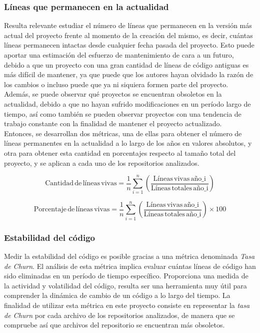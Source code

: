 \documentclass[a4paper, 12pt]{book}
\begin{document}
\subsubsection{Líneas que permanecen en la actualidad}
\label{subsubsec:lineas-vivas}

Resulta relevante estudiar el número de líneas que permanecen en la versión más actual del proyecto frente al momento de la creación del mismo, es decir, cuántas líneas permanecen intactas desde cualquier fecha pasada del proyecto. 
Esto puede aportar una estimación del esfuerzo de mantenimiento de cara a un futuro, debido a que un proyecto con una gran cantidad de líneas de código antiguas es más difícil de mantener, ya que puede que los autores 
hayan olvidado la razón de los cambios o incluso puede que ya ni siquiera formen parte del proyecto. Además, se puede observar qué proyectos se encuentran obsoletos en la actualidad, debido a que no hayan sufrido
modificaciones en un período largo de tiempo, así como también se pueden observar proyectos con una tendencia de trabajo constante con la finalidad de mantener el proyecto actualizado.
\\Entonces, se desarrollan dos métricas, una de ellas para obtener el número de líneas permanentes en la actualidad a lo largo de los años en valores absolutos, y otra para obtener esta cantidad en porcentajes respecto al tamaño total
del proyecto, y se aplican a cada uno de los repositorios analizados.

\[\text{Cantidad} \, \text{de} \, \text{líneas} \, \text{vivas} = \frac{1}{n} \sum_{i=1}^{n} \left( \frac{\text{Líneas} \, \text{vivas} \, \text{año_i}}{\text{Líneas} \, \text{totales} \, \text{año_i}} \right)\]

\[\text{Porcentaje} \, \text{de} \, \text{líneas} \, \text{vivas} = \frac{1}{n} \sum_{i=1}^{n} \left( \frac{\text{Líneas} \, \text{vivas} \, \text{año_i}}{\text{Líneas} \, \text{totales} \, \text{año_i}} \right) \times 100 \]


\subsubsection{Estabilidad del código}
\label{subsubsec:estabilidad-codigo}

Medir la estabilidad del código es posible gracias a una métrica denominada \textit{Tasa de Churn}. El análisis de esta métrica implica evaluar cuántas líneas de código han sido eliminadas en un período de tiempo específico.
Proporciona una medida de la actividad y volatilidad del código, resulta ser una herramienta muy útil para comprender la dinámica de cambio de un código a lo largo del tiempo. La finalidad de utilizar esta métrica en este proyecto
consiste en representar la \textit{tasa de Churn} por cada archivo de los repositorios analizados, de manera que se compruebe así que archivos del repositorio se encuentran más obsoletos.
\end{document}
